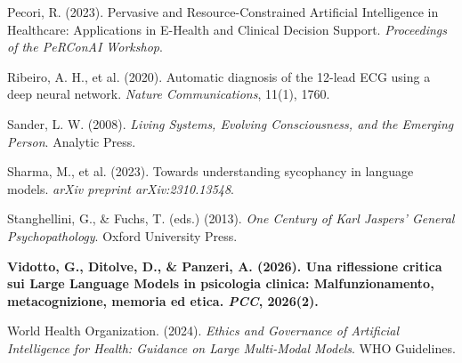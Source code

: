 \documentclass[11pt,a4paper]{article}
\begin{document}
\begin{enumerate}[label={[\arabic*]}]
    \item Pecori, R. (2023). Pervasive and Resource-Constrained Artificial Intelligence in Healthcare: Applications in E-Health and Clinical Decision Support. \textit{Proceedings of the PeRConAI Workshop}.
    \item Ribeiro, A. H., et al. (2020). Automatic diagnosis of the 12-lead ECG using a deep neural network. \textit{Nature Communications}, 11(1), 1760.
    \item Sander, L. W. (2008). \textit{Living Systems, Evolving Consciousness, and the Emerging Person}. Analytic Press.
    \item Sharma, M., et al. (2023). Towards understanding sycophancy in language models. \textit{arXiv preprint arXiv:2310.13548}.
    \item Stanghellini, G., \& Fuchs, T. (eds.) (2013). \textit{One Century of Karl Jaspers' General Psychopathology}. Oxford University Press.
    \item \textbf{Vidotto, G., Ditolve, D., \& Panzeri, A. (2026). Una riflessione critica sui Large Language Models in psicologia clinica: Malfunzionamento, metacognizione, memoria ed etica. \textit{PCC}, 2026(2).}
    \item World Health Organization. (2024). \textit{Ethics and Governance of Artificial Intelligence for Health: Guidance on Large Multi-Modal Models}. WHO Guidelines.
\end{enumerate}
\end{document}
